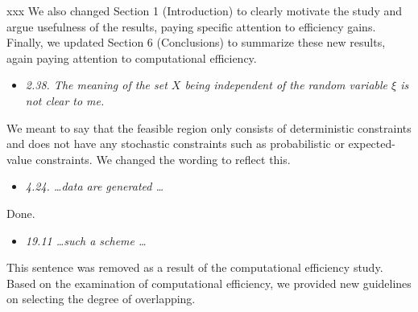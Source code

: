 \documentclass[11pt,notitlepage,onecolumn]{article}
\newcommand{\noi}{\noindent}
\begin{document}
xxx 
We also changed Section 1 (Introduction) to clearly motivate the study and argue usefulness of the results, paying specific attention to efficiency gains.
Finally, we updated Section 6 (Conclusions) to summarize these new results, again paying attention to computational efficiency.  


\medskip  

\bigskip 


\noi {\bf \large Minor comments:}
\medskip 



\begin{itemize}
\item[] \textit{2.38. The meaning of the set $X$ being independent of the random variable $\xi$ is not clear to me.}
\end{itemize}

\noi 
We meant to say that the feasible region only consists of deterministic constraints and does not have any stochastic constraints such as probabilistic or expected-value constraints. 
We changed the wording to reflect this. 
\medskip 


\begin{itemize}
\item[] \textit{4.24. \ldots data are generated \ldots}
\end{itemize}

\noi 
Done.
\medskip

\begin{itemize}
\item[] \textit{19.11 \ldots such a scheme \ldots}
\end{itemize}

\noi
This sentence was removed as a result of the computational efficiency study. 
Based on the examination of computational efficiency, we provided new guidelines on selecting the degree of overlapping. 
\end{document}
